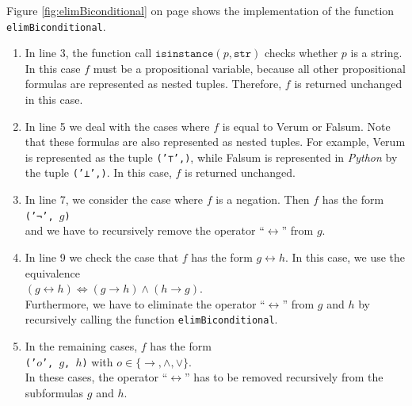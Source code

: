 Figure \ref{fig:elimBiconditional} on page \pageref{fig:elimBiconditional} shows the implementation of the
function \texttt{elimBiconditional}.
\begin{enumerate}
\item In line 3, the function call $\texttt{isinstance}(p, \mathtt{str})$ checks whether $p$ is a string.  In this case
      $f$ must be a propositional variable, because all other propositional formulas are represented as nested tuples.
      Therefore, $f$ is returned unchanged in this case.
\item In line 5 we deal with the cases where $f$ is equal to Verum or Falsum.
      Note that these formulas are also represented as nested tuples.
      For example, Verum is represented as the tuple \texttt{('⊤',)}, while Falsum is represented in
      \textsl{Python} by the tuple \texttt{('⊥',)}.  In this case, $f$
      is returned unchanged.
\item In line 7, we consider the case where $f$ is a negation.  Then $f$ has the form
      \\[0.2cm]
      \hspace*{1.3cm}
      \texttt{('¬', $g$)}  
      \\[0.2cm]
      and we have to recursively remove the operator ``$\leftrightarrow$'' from $g$.
\item In line 9 we check the case that $f$ has the form $g \leftrightarrow h$.
      In this case, we use the equivalence
      \\[0.2cm]
      \hspace*{1.3cm}
      $(g \leftrightarrow h) \Leftrightarrow (g \rightarrow h) \wedge (h \rightarrow g)$.
      \\[0.2cm]
      Furthermore, we have to eliminate the operator ``$\leftrightarrow$'' from $g$ and $h$ by recursively
      calling the function \texttt{elimBiconditional}.
\item In the remaining cases, $f$ has the form
      \\[0.2cm]
      \hspace*{1.3cm}
      \texttt{('$o$', $g$, $h$)}  \quad with $o \in \{\rightarrow, \wedge, \vee\}$.
      \\[0.2cm]
      In these cases, the operator ``$\leftrightarrow$'' has to be removed recursively from the subformulas $g$ and $h$. 
\end{enumerate}
\FloatBarrier

